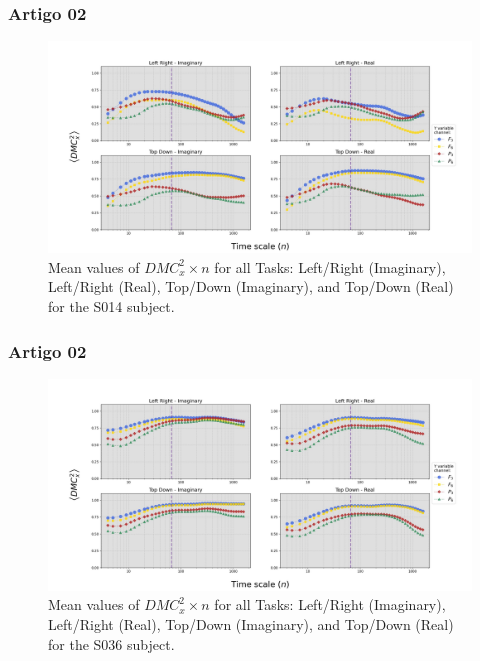 \documentclass[11pt, aspectratio=169]{beamer}
\begin{document}
\begin{frame}
  \frametitle{Artigo 02}

  \begin{figure}[!h]
    \includegraphics[height=.5\paperheight]{../Figures/art_02/Fig3.jpg}
    \caption{Mean values of $DMC_{x}^{2} \times n$ for all Tasks: Left/Right (Imaginary), Left/Right (Real), Top/Down (Imaginary), and Top/Down (Real) for the S014 subject.}
    \label{fig03}
  \end{figure}
\end{frame}


\begin{frame}
  \frametitle{Artigo 02}

  \begin{figure}[!h]
    \includegraphics[height=.5\paperheight]{../Figures/art_02/Fig4.jpg}
    \caption{Mean values of $DMC_{x}^{2} \times n$ for all Tasks: Left/Right (Imaginary), Left/Right (Real), Top/Down (Imaginary), and Top/Down (Real) for the S036 subject.}
    \label{fig04}
  \end{figure}
\end{frame}
\end{document}
